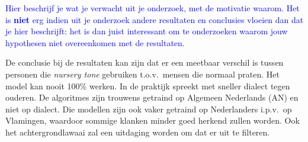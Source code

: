 \textcolor{blue}{Hier beschrijf je wat je verwacht uit je onderzoek, met de motivatie waarom. Het is \textbf{niet} erg indien uit je onderzoek andere resultaten en conclusies vloeien dan dat je hier beschrijft: het is dan juist interessant om te onderzoeken waarom jouw hypothesen niet overeenkomen met de resultaten.}

De conclusie bij de resultaten kan zijn dat er een meetbaar verschil is tussen personen die \textit{nursery tone} gebruiken t.o.v.\ mensen die normaal praten.
Het model kan nooit 100\% werken.
In de praktijk spreekt met sneller dialect tegen ouderen.
De algoritmes zijn trouwens getraind op Algemeen Nederlands (AN) en niet op dialect.
Die modellen zijn ook vaker getraind op Nederlanders i.p.v.\ op Vlamingen, waardoor sommige klanken minder goed herkend zullen worden.
Ook het achtergrondlawaai zal een uitdaging worden om dat er uit te filteren.
